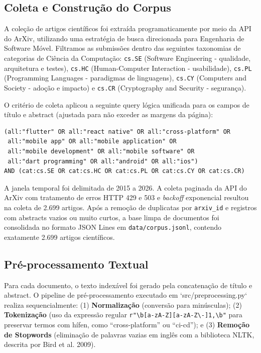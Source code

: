 \documentclass[12pt]{article}
\begin{document}
\subsection{Coleta e Construção do Corpus}

A coleção de artigos científicos foi extraída programaticamente por meio da API do ArXiv, utilizando uma estratégia de busca direcionada para Engenharia de Software Móvel. Filtramos as submissões dentro das seguintes taxonomias de categorias de Ciência da Computação: \texttt{cs.SE} (Software Engineering - qualidade, arquitetura e testes), \texttt{cs.HC} (Human-Computer Interaction - usabilidade), \texttt{cs.PL} (Programming Languages - paradigmas de linguagens), \texttt{cs.CY} (Computers and Society - adoção e impacto) e \texttt{cs.CR} (Cryptography and Security - segurança).

O critério de coleta aplicou a seguinte query lógica unificada para os campos de título e abstract (ajustada para não exceder as margens da página):
\begin{verbatim}
(all:"flutter" OR all:"react native" OR all:"cross-platform" OR
 all:"mobile app" OR all:"mobile application" OR
 all:"mobile development" OR all:"mobile software" OR
 all:"dart programming" OR all:"android" OR all:"ios")
AND (cat:cs.SE OR cat:cs.HC OR cat:cs.PL OR cat:cs.CY OR cat:cs.CR)
\end{verbatim}

A janela temporal foi delimitada de 2015 a 2026. A coleta paginada da API do ArXiv com tratamento de erros HTTP 429 e 503 e \textit{backoff} exponencial resultou na coleta de 2.699 artigos. Após a remoção de duplicatas por \texttt{arxiv\_id} e registros com abstracts vazios ou muito curtos, a base limpa de documentos foi consolidada no formato JSON Lines em \texttt{data/corpus.jsonl}, contendo exatamente 2.699 artigos científicos.

\subsection{Pré-processamento Textual}

Para cada documento, o texto indexável foi gerado pela concatenação de título e abstract. O pipeline de pré-processamento executado em `src/preprocessing.py` realiza sequencialmente: (1) \textbf{Normalização} (conversão para minúsculas); (2) \textbf{Tokenização} (uso da expressão regular \texttt{r"\textbackslash b[a-zA-Z][a-zA-Z\textbackslash-]{1,}\textbackslash b"} para preservar termos com hífen, como ``cross-platform'' ou ``ci-cd''); e (3) \textbf{Remoção de Stopwords} (eliminação de palavras vazias em inglês com a biblioteca NLTK, descrita por Bird et al. 2009).
\end{document}
